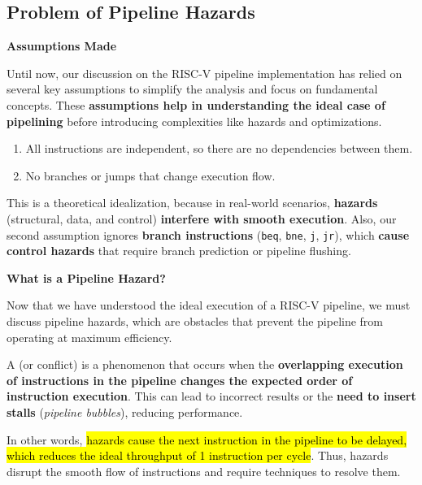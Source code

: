 \subsection{Problem of Pipeline Hazards}

\begin{flushleft}
    \textcolor{Red2}{ \textbf{Assumptions Made}}
\end{flushleft}
Until now, our discussion on the RISC-V pipeline implementation has relied on several key assumptions to simplify the analysis and focus on fundamental concepts. These \textbf{assumptions help in understanding the ideal case of pipelining} before introducing complexities like hazards and optimizations.
\begin{enumerate}
    \item All instructions are independent, so there are no dependencies between them.

    \item No branches or jumps that change execution flow.
\end{enumerate}
This is a theoretical idealization, because in real-world scenarios, \textbf{hazards} (structural, data, and control) \textbf{interfere with smooth execution}. Also, our second assumption ignores \textbf{branch instructions} (\texttt{beq}, \texttt{bne}, \texttt{j}, \texttt{jr}), which \textbf{cause control hazards} that require branch prediction or pipeline flushing.

\highspace
\begin{flushleft}
    \textcolor{Green3}{ \textbf{What is a Pipeline Hazard?}}
\end{flushleft}
Now that we have understood the ideal execution of a RISC-V pipeline, we must discuss pipeline hazards, which are obstacles that prevent the pipeline from operating at maximum efficiency.  

\highspace
A  (or conflict) is a phenomenon that occurs when the \textbf{overlapping execution of instructions in the pipeline changes the expected order of instruction execution}. This can lead to incorrect results or the \textbf{need to insert stalls} (\emph{pipeline bubbles}), reducing performance.  

\highspace
In other words, \hl{hazards cause the next instruction in the pipeline to be delayed, which reduces the ideal throughput of 1 instruction per cycle}. Thus, hazards disrupt the smooth flow of instructions and require techniques to resolve them.

